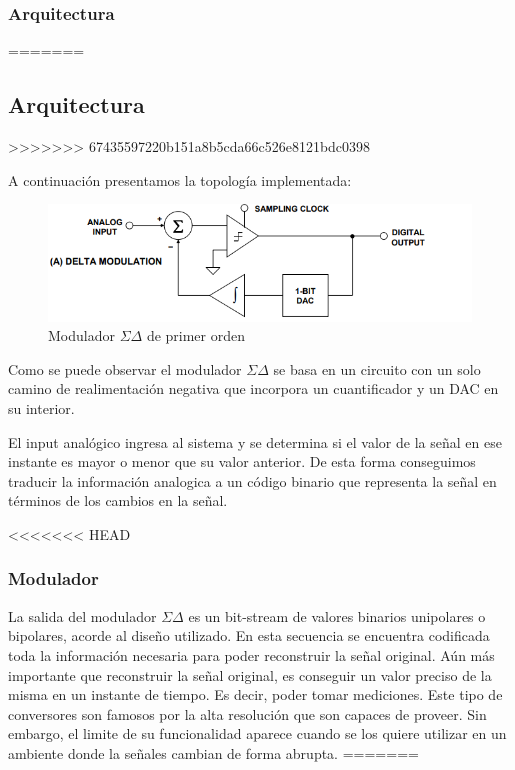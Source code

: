 \subsubsection{Arquitectura}
=======
\subsection{Arquitectura}
>>>>>>> 67435597220b151a8b5cda66c526e8121bdc0398

A continuación presentamos la topología implementada:

\begin{figure}[H]
	\centering
	\includegraphics[width=0.7\linewidth]{ImagenesEjercicio2/diagramaEnBloques}
	\caption{Modulador $\Sigma\Delta$ de primer orden}
	\label{fig:diagramaenbloques}
\end{figure}

Como se puede observar el modulador $\Sigma\Delta$ se basa en un circuito con un solo camino de realimentación negativa que incorpora un cuantificador y un DAC en su interior.

El input analógico ingresa al sistema y se determina si el valor de la señal en ese instante es mayor o menor que su valor anterior. De esta forma conseguimos traducir la información analogica a un código binario que representa la señal en términos de los cambios en la señal.



<<<<<<< HEAD
\subsubsection{Modulador}
La salida del modulador $\Sigma\Delta$ es un bit-stream de valores binarios unipolares o bipolares, acorde al diseño utilizado. En esta secuencia se encuentra codificada toda la información necesaria para poder reconstruir la señal original. Aún más importante que reconstruir la señal original, es conseguir un valor preciso de la misma en un instante de tiempo. Es decir, poder tomar mediciones. Este tipo de conversores son famosos por la alta resolución que son capaces de proveer. Sin embargo, el limite de su funcionalidad aparece cuando se los quiere utilizar en un ambiente donde la señales cambian de forma abrupta.
=======
